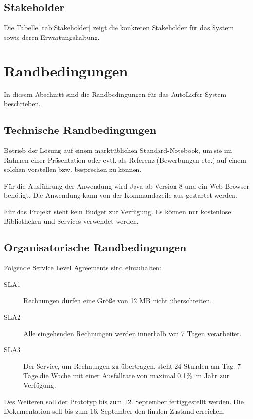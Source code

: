 \subsection{Stakeholder}\label{_stakeholder}

Die Tabelle \ref{tab:Stakeholder} zeigt die konkreten Stakeholder für das System sowie deren Erwartungshaltung.



\section{Randbedingungen}\label{section-architecture-constraints}

In diesem Abschnitt sind die Randbedingungen für das AutoLiefer-System beschrieben.

\subsection{Technische Randbedingungen}

Betrieb der Lösung auf einem marktüblichen Standard-Notebook, um sie im Rahmen einer Präsentation oder evtl. als Referenz (Bewerbungen etc.) auf einem solchen vorstellen bzw. besprechen zu können.

Für die Ausführung der Anwendung wird Java ab Version 8 und ein Web-Browser benötigt. Die Anwendung kann von der Kommandozeile aus gestartet werden.

Für das Projekt steht kein Budget zur Verfügung. Es können nur kostenlose Bibliotheken und Services verwendet werden.

\subsection{Organisatorische Randbedingungen}

Folgende Service Level Agreements sind einzuhalten:
\begin{description}
  \item[SLA1] Rechnungen dürfen eine Größe von 12 MB nicht überschreiten.
  \item[SLA2] Alle eingehenden Rechnungen werden innerhalb von 7 Tagen verarbeitet.
  \item[SLA3] Der Service, um Rechnungen zu übertragen, steht 24 Stunden am Tag, 7 Tage die Woche mit einer Ausfallrate von maximal 0,1\% im Jahr zur Verfügung.
\end{description}

Des Weiteren soll der Prototyp bis zum 12. September fertiggestellt werden. Die Dokumentation soll bis zum 16. September den finalen Zustand erreichen.

